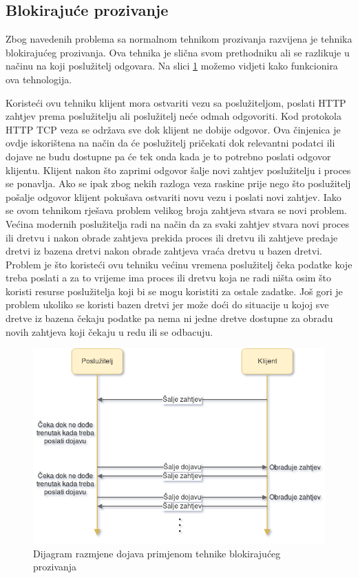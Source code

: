 \documentclass[times, utf8, zavrsni]{fer}
\begin{document}
\subsection{Blokirajuće prozivanje}
Zbog navedenih problema sa normalnom tehnikom prozivanja razvijena je tehnika blokirajućeg prozivanja. Ova tehnika je slična svom prethodniku ali se razlikuje u načinu na koji poslužitelj odgovara. Na slici \ref{fig:long-polling-image} možemo vidjeti kako funkcionira ova tehnologija. 

Koristeći ovu tehniku klijent mora ostvariti vezu sa poslužiteljom, poslati HTTP zahtjev prema poslužitelju ali poslužitelj neće odmah odgovoriti. Kod protokola HTTP TCP veza se održava sve dok klijent ne dobije odgovor. Ova činjenica je ovdje iskorištena na način da će poslužitelj pričekati dok relevantni podatci ili dojave ne budu dostupne pa će tek onda kada je to potrebno poslati odgovor klijentu. Klijent nakon što zaprimi odgovor šalje novi zahtjev poslužitelju i proces se ponavlja. Ako se ipak zbog nekih razloga veza raskine prije nego što poslužitelj pošalje odgovor klijent pokušava ostvariti novu vezu i poslati novi zahtjev. Iako se ovom tehnikom rješava problem velikog broja zahtjeva stvara se novi problem. Većina modernih poslužitelja radi na način da za svaki zahtjev stvara novi proces ili dretvu i nakon obrade zahtjeva prekida proces ili dretvu ili zahtjeve predaje dretvi iz bazena dretvi nakon obrade zahtjeva  vraća dretvu u bazen dretvi. Problem je što koristeći ovu tehniku većinu vremena poslužitelj čeka podatke koje treba poslati a za to vrijeme ima proces ili dretvu koja ne radi ništa osim što koristi resurse poslužitelja koji bi se mogu koristiti za ostale zadatke. Još gori je problem ukoliko se koristi bazen dretvi jer može doći do situacije u kojoj sve dretve iz bazena čekaju podatke pa nema ni jedne dretve dostupne za obradu novih zahtjeva koji čekaju u redu ili se odbacuju.

\begin{figure}[htb]
\centering
\includegraphics[width=14cm]{img/long-polling.png}
\caption{Dijagram razmjene dojava primjenom tehnike blokirajućeg prozivanja}
\label{fig:long-polling-image}
\end{figure}
\end{document}

